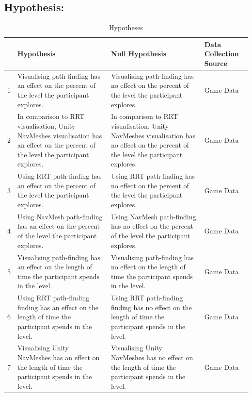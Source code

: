 \documentclass[journal]{IEEEtran}
\begin{document}
	\subsection{Hypothesis:} \label{hypothesis}
	\begin{table}[h]
		\centering
		\caption{Hypotheses}
		\label{table:Hypothesis}
		\def\arraystretch{1.5}
		\begin{tabular}{|c|p{7cm}|p{7cm}|p{1.75cm}|}
			\hline
			& \textbf{Hypothesis}& \textbf{Null Hypothesis} & \textbf{Data Collection Source}\\
			\hline
			1 & Visualising path-finding has an effect on the percent of the level the participant explores.
			& Visualising path-finding has no effect on the percent of the level the participant explores.
			& Game Data \\ \hline
			
			2 & In comparison to RRT visualisation, Unity NavMeshes visualisation has an effect on the percent of the level the participant explores.
			& In comparison to RRT visualisation, Unity NavMeshes visualisation has no effect on the percent of the level the participant explores.
			& Game Data \\ \hline
			
			3 & Using RRT path-finding has an effect on the percent of the level the participant explores.
			& Using RRT path-finding has no effect on the percent of the level the participant explores.
			& Game Data \\ \hline
			
			4 & Using NavMesh path-finding has an effect on the percent of the level the participant explores.
			& Using NavMesh path-finding has no effect on the percent of the level the participant explores.
			& Game Data \\ \hline
			
			5 & Visualising path-finding has an effect on the length of time the participant spends in the level. 
			& Visualising path-finding has no effect on the length of time the participant spends in the level. 
			& Game Data \\ \hline
			
			6 & Using RRT path-finding finding has an effect on the length of time the participant spends in the level. 
			& Using RRT path-finding finding has no effect on the length of time the participant spends in the level. 
			& Game Data \\ \hline
			
			7 & Visualising Unity NavMeshes has an effect on the length of time the participant spends in the level. 
			& Visualising Unity NavMeshes has no effect on the length of time the participant spends in the level.
			& Game Data \\ \hline
			

\end{tabular}
\end{table}
\end{document}
